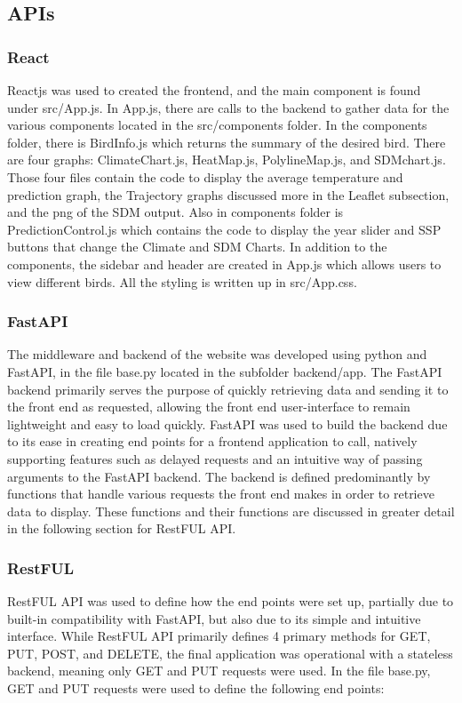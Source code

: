 \documentclass{article}
\begin{document}
\subsection{APIs}

\subsubsection*{React}
Reactjs was used to created the frontend, and the main component is found under src/App.js. In App.js, there are calls to the backend to gather data for the various components
located in the src/components folder. In the components folder, there is BirdInfo.js which returns the summary of the desired bird. There are four graphs: ClimateChart.js,
HeatMap.js, PolylineMap.js, and SDMchart.js. Those four files contain the code to display the average temperature and prediction graph, the Trajectory graphs discussed more 
in the Leaflet subsection, and the png of the SDM output. Also in components folder is PredictionControl.js which contains the code to display the year slider and SSP buttons that 
change the Climate and SDM Charts. In addition to the components, the sidebar and header are created in App.js which allows users to view different birds. All the styling is written 
up in src/App.css. 

\subsubsection*{FastAPI}
The middleware and backend of the website was developed using python and FastAPI, in the file base.py located in the subfolder backend/app. The FastAPI backend primarily serves the purpose of quickly retrieving data and sending it to the front end as requested, allowing the front end user-interface to remain lightweight and easy to load quickly. FastAPI was used to build the backend due to its ease in creating end points for a frontend application to call, natively supporting features such as delayed requests and an intuitive way of passing arguments to the FastAPI backend.
The backend is defined predominantly by functions that handle various requests the front end makes in order to retrieve data to display. These functions and their functions are discussed in greater detail in the following section for RestFUL API.

\subsubsection*{RestFUL}
RestFUL API was used to define how the end points were set up, partially due to built-in compatibility with FastAPI, but also due to its simple and intuitive interface. While RestFUL API primarily defines 4 primary methods for GET, PUT, POST, and DELETE, the final application was operational with a stateless backend, meaning only GET and PUT requests were used.
In the file base.py, GET and PUT requests were used to define the following end points:
\end{document}

